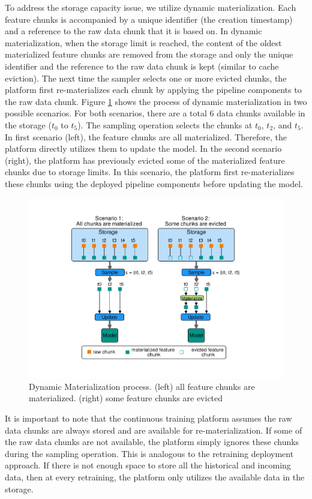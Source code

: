 To address the storage capacity issue, we utilize dynamic materialization.
Each feature chunks is accompanied by a unique identifier (the creation timestamp) and a reference to the raw data chunk that it is based on.
In dynamic materialization, when the storage limit is reached, the content of the oldest materialized feature chunks are removed from the storage and only the unique identifier and the reference to the raw data chunk is kept (similar to cache eviction).
The next time the sampler selects one or more evicted chunks, the platform first re-materializes each chunk by applying the pipeline components to the raw data chunk.
Figure \ref{fig:dynamic-materialization-process} shows the process of dynamic materialization in two possible scenarios.
For both scenarios, there are a total 6 data chunks available in the storage ($t_0$ to $t_5$).
The sampling operation selects the chunks at $t_0$, $t_2$, and $t_5$.
In first scenario (left), the feature chunks are all materialized.
Therefore, the platform directly utilizes them to update the model.
In the second scenario (right), the platform has previously evicted some of the materialized feature chunks due to storage limits.
In this scenario, the platform first re-materializes these chunks using the deployed pipeline components before updating the model.

\begin{figure}[h]
\centering
\includegraphics[width=\columnwidth]{../images/dynamic-materialization.pdf}
\caption{Dynamic Materialization process. (left) all feature chunks are materialized. (right) some feature chunks are evicted}
\label{fig:dynamic-materialization-process}
\end{figure}
It is important to note that the continuous training platform assumes the raw data chunks are always stored and are available for re-materialization.
If some of the raw data chunks are not available, the platform simply ignores these chunks during the sampling operation.
This is analogous to the retraining deployment approach.
If there is not enough space to store all the historical and incoming data, then at every retraining, the platform only utilizes the available data in the storage.

